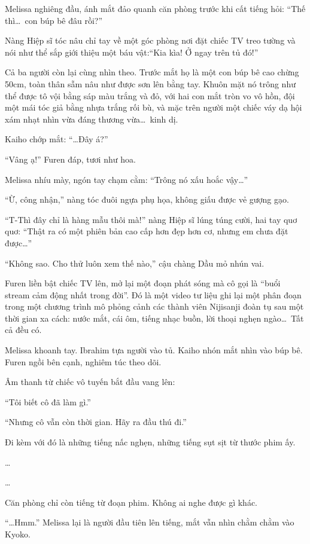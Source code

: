 \documentclass[../main.tex]{subfiles}
\begin{document}
Melissa nghiêng đầu, ánh mắt đảo quanh căn phòng trước khi cất tiếng hỏi: ``Thế thì\dots\ con búp bê đâu rồi?''

Nàng Hiệp sĩ tóc nâu chỉ tay về một góc phòng nơi đặt chiếc TV treo tường và nói như thể sắp giới thiệu một báu vật:``Kia kìa! Ở ngay trên tủ đó!''

Cả ba người còn lại cùng nhìn theo. Trước mắt họ là một con búp bê cao chừng 50cm, toàn thân sẫm nâu như được sơn lên bằng tay. Khuôn mặt nó trông như thể được tô vội bằng sáp màu trắng và đỏ, với hai con mắt tròn vo vô hồn, đội một mái tóc giả bằng nhựa trắng rối bù, và mặc trên người một chiếc váy dạ hội xám nhạt nhìn vừa đáng thương vừa\dots\ kinh dị.


Kaiho chớp mắt: ``\dots Đây á?''

``Vâng ạ!'' Furen đáp, tươi như hoa.

Melissa nhíu mày, ngón tay chạm cằm: ``Trông nó xấu hoắc vậy\dots''

``Ừ, công nhận,'' nàng tóc đuôi ngựa phụ họa, không giấu được vẻ gượng gạo.

``T-Thì đây chỉ là hàng mẫu thôi mà!'' nàng Hiệp sĩ lúng túng cười, hai tay quơ quơ: ``Thật ra có một phiên bản cao cấp hơn đẹp hơn cơ, nhưng em chưa đặt được\dots''

``Không sao. Cho thử luôn xem thế nào,'' cậu chàng Dầu mỏ nhún vai.

Furen liền bật chiếc TV lên, mở lại một đoạn phát sóng mà cô gọi là ``buổi stream cảm động nhất trong đời''. Đó là một video tư liệu ghi lại một phân đoạn trong một chương trình mô phỏng cảnh các thành viên Nijisanji đoàn tụ sau một thời gian xa cách: nước mắt, cái ôm, tiếng nhạc buồn, lời thoại nghẹn ngào\dots\ Tất cả đều có.

Melissa khoanh tay. Ibrahim tựa người vào tủ. Kaiho nhón mắt nhìn vào búp bê. Furen ngồi bên cạnh, nghiêm túc theo dõi.

Âm thanh từ chiếc vô tuyến bắt đầu vang lên:

``Tôi biết cô đã làm gì.''

``Nhưng cô vẫn còn thời gian. Hãy ra đầu thú đi.''

Đi kèm với đó là những tiếng nấc nghẹn, những tiếng sụt sịt từ thước phim ấy.

\dots

\dots

Căn phòng chỉ còn tiếng từ đoạn phim. Không ai nghe được gì khác.

``\dots Hmm.'' Melissa lại là người đầu tiên lên tiếng, mắt vẫn nhìn chằm chằm vào Kyoko.
\end{document}
